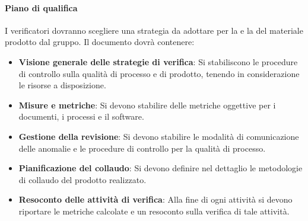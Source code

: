     \paragraph{Piano di qualifica}
     I verificatori dovranno scegliere una strategia da adottare per la  e la  del materiale prodotto dal gruppo. Il documento dovrà contenere:
     \begin{itemize}
         \item \textbf{Visione generale delle strategie di verifica}: Si stabiliscono le procedure di controllo sulla qualità di processo e di prodotto, tenendo in considerazione le risorse a disposizione.
         \item \textbf{Misure e metriche}: Si devono stabilire delle metriche oggettive per i documenti, i processi e il software.
         \item \textbf{Gestione della revisione}: Si devono stabilire le modalità di comunicazione delle anomalie e le procedure di controllo per la qualità di processo.
         \item \textbf{Pianificazione del collaudo}: Si devono definire nel dettaglio le metodologie di collaudo del prodotto realizzato.
         \item \textbf{Resoconto delle attività di verifica}: Alla fine di ogni attività si devono riportare le metriche calcolate e un resoconto sulla verifica di tale attività.
     \end{itemize}














